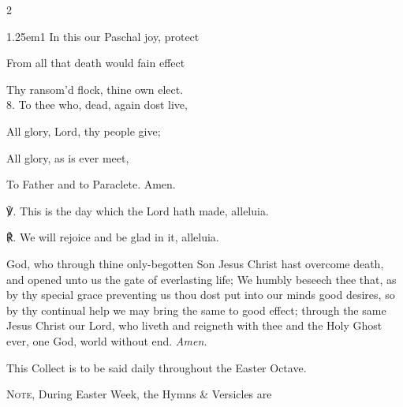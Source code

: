 \begin{multicols}{2}
\begin{hangparas}{1.25em}{1}
In this our Paschal joy, protect

From all that death would fain effect

Thy ransom'd flock, thine own elect.\\

8. To thee who, dead, again dost live,

All glory, Lord, thy people give;

All glory, as is ever meet,

To Father and to Paraclete. Amen.\\
\end{hangparas}

℣. This is the day which the Lord hath made, alleluia.

℟. We will rejoice and be glad in it, alleluia.

\end{multicols}

\collect\label{EasterCollect}
 God, who through thine only-begotten Son Jesus Christ hast overcome death, and opened unto us the gate of everlasting life; We humbly beseech thee that, as by thy special grace preventing us thou dost put into our minds good desires, so by thy continual help we may bring the same to good effect; through the same Jesus Christ our Lord, who liveth and reigneth with thee and the Holy Ghost ever, one God, world without end. \textit{Amen.}

\begin{rubric}
    This Collect is to be said daily throughout the Easter Octave.
\end{rubric}

\begin{rubric}
	\textsc{Note,} During Easter Week, the Hymns \& Versicles are 
\end{rubric}



\mattins



